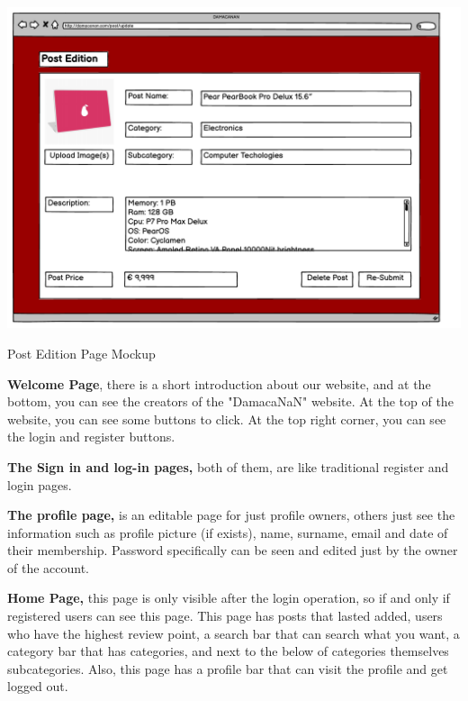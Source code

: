 \begin{center}
\includegraphics[scale = 0.7, center]{Mockup/Post_Edit_Mockup.pdf}
\caption{Post Edition Page Mockup}
\label{fig:my_label}
\end{center} \newline




\textbf{Welcome Page},  there is a short introduction about our website, and at the bottom, you can see the creators of the "DamacaNaN" website. At the top of the website, you can see some buttons to click. At the top right corner, you can see the login and register buttons. \newline

\textbf{The Sign in and log-in pages,} both of them, are like traditional register and login pages. \newline

\textbf{The profile page,} is an editable page for just profile owners, others just see the information such as profile picture (if exists), name, surname, email and date of their membership. Password specifically can be seen and edited just by the owner of the account. \newline

\textbf{Home Page, }this page is only visible after the login operation, so if and only if registered users can see this page. This page has posts that lasted added, users who have the highest review point, a search bar that can search what you want, a category bar that has categories, and next to the below of categories themselves subcategories. Also, this page has a profile bar that can visit the profile and get logged out. \newline

